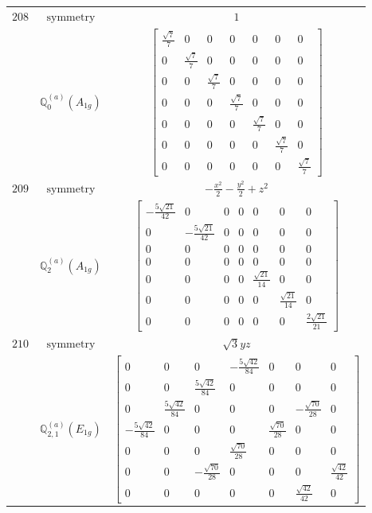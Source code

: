 \documentclass[fleqn,8pt,landscape]{jsarticle}
\begin{document}
\begin{longtable}{ccc}
$ 208 $ & $ \text{symmetry} $ & $ 1 $ \\
$  $ & $ \mathbb{Q}_{0}^{(a)}(A_{1g}) $ & $ \begin{bmatrix} \frac{\sqrt{7}}{7} & 0 & 0 & 0 & 0 & 0 & 0 \\ 0 & \frac{\sqrt{7}}{7} & 0 & 0 & 0 & 0 & 0 \\ 0 & 0 & \frac{\sqrt{7}}{7} & 0 & 0 & 0 & 0 \\ 0 & 0 & 0 & \frac{\sqrt{7}}{7} & 0 & 0 & 0 \\ 0 & 0 & 0 & 0 & \frac{\sqrt{7}}{7} & 0 & 0 \\ 0 & 0 & 0 & 0 & 0 & \frac{\sqrt{7}}{7} & 0 \\ 0 & 0 & 0 & 0 & 0 & 0 & \frac{\sqrt{7}}{7} \end{bmatrix} $ \\ \hline
$ 209 $ & $ \text{symmetry} $ & $ - \frac{x^{2}}{2} - \frac{y^{2}}{2} + z^{2} $ \\
$  $ & $ \mathbb{Q}_{2}^{(a)}(A_{1g}) $ & $ \begin{bmatrix} - \frac{5 \sqrt{21}}{42} & 0 & 0 & 0 & 0 & 0 & 0 \\ 0 & - \frac{5 \sqrt{21}}{42} & 0 & 0 & 0 & 0 & 0 \\ 0 & 0 & 0 & 0 & 0 & 0 & 0 \\ 0 & 0 & 0 & 0 & 0 & 0 & 0 \\ 0 & 0 & 0 & 0 & \frac{\sqrt{21}}{14} & 0 & 0 \\ 0 & 0 & 0 & 0 & 0 & \frac{\sqrt{21}}{14} & 0 \\ 0 & 0 & 0 & 0 & 0 & 0 & \frac{2 \sqrt{21}}{21} \end{bmatrix} $ \\ \hline
$ 210 $ & $ \text{symmetry} $ & $ \sqrt{3} y z $ \\
$  $ & $ \mathbb{Q}_{2,1}^{(a)}(E_{1g}) $ & $ \begin{bmatrix} 0 & 0 & 0 & - \frac{5 \sqrt{42}}{84} & 0 & 0 & 0 \\ 0 & 0 & \frac{5 \sqrt{42}}{84} & 0 & 0 & 0 & 0 \\ 0 & \frac{5 \sqrt{42}}{84} & 0 & 0 & 0 & - \frac{\sqrt{70}}{28} & 0 \\ - \frac{5 \sqrt{42}}{84} & 0 & 0 & 0 & \frac{\sqrt{70}}{28} & 0 & 0 \\ 0 & 0 & 0 & \frac{\sqrt{70}}{28} & 0 & 0 & 0 \\ 0 & 0 & - \frac{\sqrt{70}}{28} & 0 & 0 & 0 & \frac{\sqrt{42}}{42} \\ 0 & 0 & 0 & 0 & 0 & \frac{\sqrt{42}}{42} & 0 \end{bmatrix} $ \\ \hline

\end{longtable}
\end{document}
